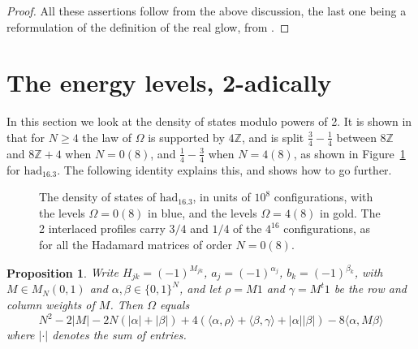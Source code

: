 \documentclass[11pt,a4paper]{article}
\newtheorem{prop}[thm]{Proposition}
\theoremstyle{remark}
\begin{document}
\begin{proof}
All these assertions follow from the above discussion, the last one being a reformulation of the definition of the real glow, from \cite{ba1}.
\end{proof}

\section{The energy levels, 2-adically}\label{sec:2adic}

In this section we look at the density of states modulo powers of 2. It is shown in \cite{ba1} that for $N\geq4$ the law of $\Omega$ is supported by $4\mathbb Z$, and is split $\frac{3}{4}-\frac{1}{4}$ between $8\mathbb Z$ and $8\mathbb Z+4$ when $N=0(8)$, and $\frac{1}{4}-\frac{3}{4}$ when $N=4(8)$, as shown in Figure~\ref{fig:dosfull} for $\mathrm{had}_{16.3}$. The following identity explains this, and shows how to go further.

\begin{figure}[htb!]
\centering
{}
\caption{The density of states of $\mathrm{had}_{16.3}$, in units of $10^8$ configurations, with the levels $\Omega=0(8)$ in blue, and the levels $\Omega=4(8)$ in gold. The 2 interlaced profiles carry $3/4$ and $1/4$ of the $4^{16}$ configurations, as for all the Hadamard matrices of order $N=0(8)$.}\label{fig:dosfull}
\end{figure}

\begin{samepage}
\begin{prop}\label{prop:2adic}
Write $H_{jk}=(-1)^{M_{jk}}$, $a_j=(-1)^{\alpha_j}$, $b_k=(-1)^{\beta_k}$, with $M\in M_N(0,1)$ and $\alpha,\beta\in\{0,1\}^N$, and let $\rho=M1$ and $\gamma=M^t1$ be the row and column weights of $M$. Then $\Omega$ equals
\[
 N^2-2|M|-2N(|\alpha|+|\beta|)+4(\langle\alpha,\rho\rangle+\langle\beta,\gamma\rangle+|\alpha||\beta|)-8\langle\alpha,M\beta\rangle
\]
where $|\cdot|$ denotes the sum of entries.
\end{prop}
\end{samepage}
\end{document}
